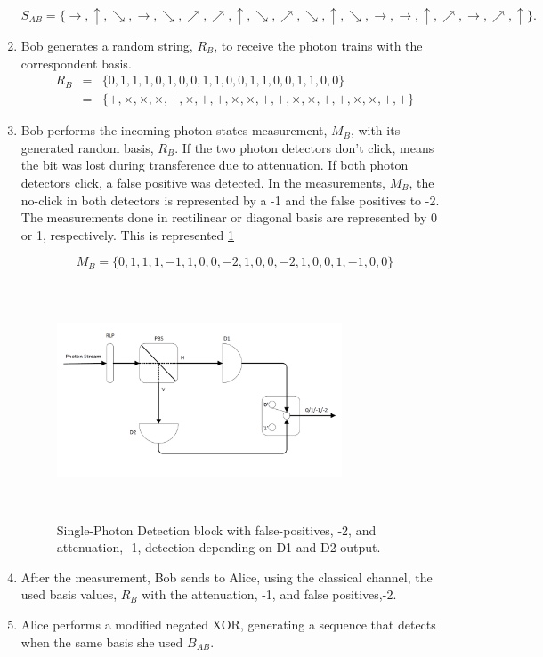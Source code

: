 \begin{refsection}
\begin{enumerate}
	$$S_{AB} = \{\to, \uparrow, \searrow, \to, \searrow, \nearrow, \nearrow, \uparrow, \searrow, \nearrow, \searrow, \uparrow, \searrow, \to, \to, \uparrow, \nearrow, \to, \nearrow, \uparrow\}.$$
	
	\item Bob generates a random string, $R_{B}$, to receive the photon trains with the correspondent basis.
	\begin{eqnarray}
		R_{B} &=& \{0,1,1,1,0,1,0,0,1,1,0,0,1,1,0,0,1,1,0,0\} \nonumber\\
		&=&\{+,\times,\times,\times,+,\times,+,+,\times,\times,+,+,\times,\times,+,+,\times,\times,+,+\} \nonumber
	\end{eqnarray}
	
	\item Bob performs the incoming photon states measurement, $M_{B}$, with its generated random basis, $R_{B}$. If the two photon detectors don't click, means the bit was lost during transference due to attenuation. If both photon detectors click, a false positive was detected. In the measurements, $M_{B}$, the no-click in both detectors is represented by a -1 and the false positives to -2. The measurements done in rectilinear or diagonal basis are represented by 0 or 1, respectively. This is represented \ref{fig:bb84 detector}
	
	$$M_{B} = \{0,1,1,1,-1,1,0,0,-2,1,0,0,-2,1,0,0,1,-1,0,0\}$$	

	\begin{figure}[H]
		\centering
		\includegraphics[width=0.8\textwidth,height=7cm]{./sdf/bb84_with_discrete_variables/figures/detector.png}
		\caption{Single-Photon Detection block with false-positives, -2, and attenuation, -1, detection depending on D1 and D2 output.\label{fig:bb84 detector}}
	\end{figure}
	
	\item After the measurement, Bob sends to Alice, using the classical channel, the used basis values, $R_{B}$ with the attenuation, -1, and false positives,-2.
	\item Alice performs a modified negated XOR, generating a sequence that detects when the same basis she used $B_{AB}$.
	

\end{enumerate}
\end{refsection}
